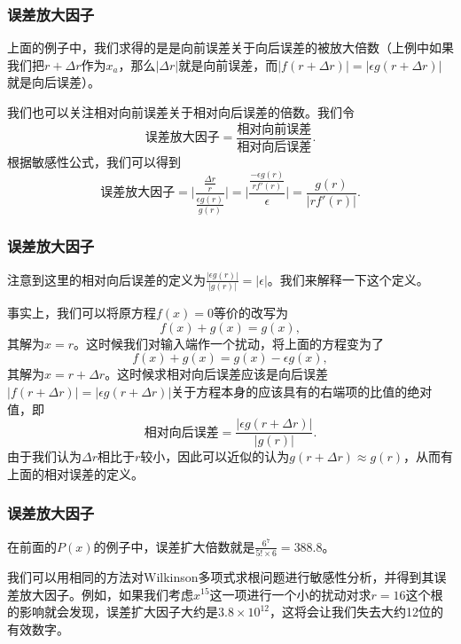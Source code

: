 \documentclass[10pt]{beamer}
\begin{document}
\begin{frame}
\frametitle{误差放大因子}
上面的例子中，我们求得的是是向前误差关于向后误差的被放大倍数（上例中如果我们把$r+ \Delta r$作为$x_a$，那么$|\Delta r|$就是向前误差，而$|f(r+\Delta r)| = |\epsilon g(r+\Delta r)|$就是向后误差）。

\vspace{0.2cm}
我们也可以关注相对向前误差关于相对向后误差的倍数。我们令
\begin{equation}
\text{误差放大因子} = \frac{\text{相对向前误差}}{\text{相对向后误差}}.
\end{equation}
根据敏感性公式，我们可以得到
\begin{equation}
\text{误差放大因子}  = \Big|\frac{\frac{\Delta r}{r}}{\frac{\epsilon g(r)}{g(r)}} \Big|
                                = \Big| \frac{\frac{-\epsilon g(r)}{rf'(r)}}{\epsilon} \Big| = \frac{g(r)}{|rf'(r)|} .
\end{equation}
\end{frame}


\begin{frame}
\frametitle{误差放大因子}
注意到这里的相对向后误差的定义为$\frac{|\epsilon g(r)|}{|g(r)|}= |\epsilon|$。我们来解释一下这个定义。

\vspace{0.2cm}
事实上，我们可以将原方程$f(x) = 0$等价的改写为
\begin{equation}
f(x) + g(x) = g(x),
\end{equation}
其解为$x = r$。这时候我们对输入端作一个扰动，将上面的方程变为了
\begin{equation}
f(x) + g(x) = g(x)- \epsilon g(x),
\end{equation}
其解为$x = r+ \Delta r$。这时候求相对向后误差应该是向后误差$|f(r+\Delta r)| = |\epsilon g(r+\Delta r)|$关于方程本身的应该具有的右端项的比值的绝对值，即
\begin{equation}
\text{相对向后误差} =  \frac{|\epsilon g(r+\Delta r)|}{|g(r)|}.
\end{equation}
由于我们认为$\Delta r$相比于$r$较小，因此可以近似的认为$g(r+\Delta r) \approx g(r)$，从而有上面的相对误差的定义。
\end{frame}


\begin{frame}
\frametitle{误差放大因子}
在前面的$P(x)$的例子中，误差扩大倍数就是$\frac{6^7}{5! \times 6} = 388.8$。

\vspace{0.2cm}
我们可以用相同的方法对Wilkinson多项式求根问题进行敏感性分析，并得到其误差放大因子。例如，如果我们考虑$x^{15}$这一项进行一个小的扰动对求$r = 16$这个根的影响就会发现，误差扩大因子大约是$3.8 \times 10^{12}$，这将会让我们失去大约12位的有效数字。
\end{frame}
\end{document}

